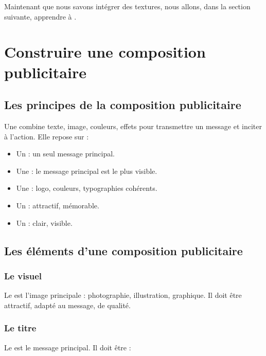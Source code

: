 Maintenant que nous savons intégrer des textures, nous allons, dans la section suivante, apprendre à .

\section{Construire une composition publicitaire}

\subsection{Les principes de la composition publicitaire}

Une  combine texte, image, couleurs, effets pour transmettre un message et inciter à l'action. Elle repose sur :

\begin{itemize}
    \item Un  : un seul message principal.
    \item Une  : le message principal est le plus visible.
    \item Une  : logo, couleurs, typographies cohérents.
    \item Un  : attractif, mémorable.
    \item Un  : clair, visible.
\end{itemize}

\subsection{Les éléments d'une composition publicitaire}

\subsubsection{Le visuel}

Le  est l'image principale : photographie, illustration, graphique. Il doit être attractif, adapté au message, de qualité.

\subsubsection{Le titre}

Le  est le message principal. Il doit être :

